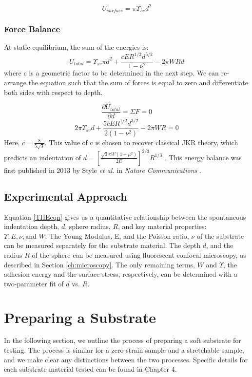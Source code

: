  \begin{equation}
 \label{surface_energy}
 U_{surface} = \pi \Upsilon_{sv} d^2
 \end{equation}

\subsubsection{Force Balance}
At static equilibrium, the sum of the energies is:
\[U_{total} = \Upsilon_{sv} \pi d^2 + \frac{cER^{1/2}d^{5/2}}{1-\nu^2} - 2\pi W R d\] 
where c is a geometric factor to be determined in the next step. We can re-arrange the equation such that the sum of forces is equal to zero and differentiate both sides with respect to depth.

\begin{equation*}
\frac{\partial U_{total}}{\partial d} = \Sigma F = 0
\end{equation*}
\begin{equation}
\label{THEeqn}
2 \pi \Upsilon_{sv}d  + \frac{5cER^{1/2}d^{3/2}}{2 \left( 1-\nu ^2 \right) }  - 2 \pi WR = 0
\end{equation}
Here,  $ c = \frac{8}{5\sqrt{3}} $. This value of c is chosen to recover classical JKR theory, which predicts an indentation of $ d =  \left[\frac{\sqrt{3}\pi W (1 - \mu^2)}{2E} \right]^{2/3}R^{1/3}$ \cite{style2013surface, jensen2015wetting,johnson1971surface}. This energy balance was first published in 2013 by Style \textit{et al.} in \textit{Nature Communications} \cite{style2013surface}. 

\subsection{Experimental Approach}
Equation \ref{THEeqn} gives us a quantitative relationship between the spontaneous indentation depth, $ d $, sphere radius, $ R $, and key material properties: $ \Upsilon, E, \nu, \text{and }W $. The Young Modulus, E, and the Poisson ratio, $\nu$ of the substrate can be measured separately for the substrate material. The depth $d$, and the radius $R$ of the sphere can be measured using fluorescent confocal microscopy, as described in Section \ref{ch:microscopy}. The only remaining terms, $W$ and $\Upsilon$, the adhesion energy and the surface stress, respectively, can be determined with a two-parameter fit of $ d $ vs. $ R. $

\section{Preparing a Substrate}
In the following section, we outline the process of preparing a soft substrate for testing. The process is similar for a zero-strain sample and a stretchable sample, and we make clear any distinctions between the two processes. Specific details for each substrate material tested can be found in Chapter 4.

